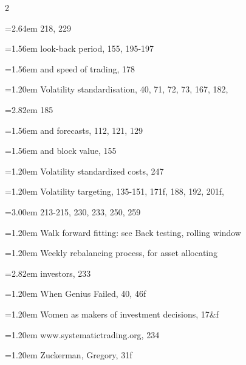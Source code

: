 {\begin{multicols}{2}
\par \noindent\hangindent=2.64em\hspace*{1.44em} 218, 229
\par \noindent\hangindent=1.56em\hspace*{0.36em} look-back period, 155, 195-197
\par \noindent\hangindent=1.56em\hspace*{0.36em} and speed of trading, 178
\par \noindent\hangindent=1.20em\hspace*{0.00em} Volatility standardisation, 40, 71, 72, 73, 167, 182,
\par \noindent\hangindent=2.82em\hspace*{1.62em} 185
\par \noindent\hangindent=1.56em\hspace*{0.36em} and forecasts, 112, 121, 129
\par \noindent\hangindent=1.56em\hspace*{0.36em} and block value, 155
\par \noindent\hangindent=1.20em\hspace*{0.00em} Volatility standardized costs, 247
\par \noindent\hangindent=1.20em\hspace*{0.00em} Volatility targeting, 135-151, 171f, 188, 192, 201f,
\par \noindent\hangindent=3.00em\hspace*{1.80em} 213-215, 230, 233, 250, 259
\par \noindent\hangindent=1.20em\hspace*{0.00em} Walk forward fitting: see Back testing, rolling window
\par \noindent\hangindent=1.20em\hspace*{0.00em} Weekly rebalancing process, for asset allocating
\par \noindent\hangindent=2.82em\hspace*{1.62em} investors, 233
\par \noindent\hangindent=1.20em\hspace*{0.00em} When Genius Failed, 40, 46f
\par \noindent\hangindent=1.20em\hspace*{0.00em} Women as makers of investment decisions, 17\&f
\par \noindent\hangindent=1.20em\hspace*{0.00em} www.systematictrading.org, 234
\par \noindent\hangindent=1.20em\hspace*{0.00em} Zuckerman, Gregory, 31f \end{multicols}

}

